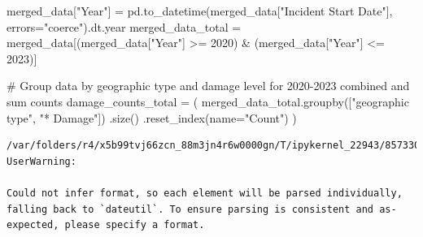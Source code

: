 \documentclass[
  letterpaper,
  DIV=11,
  numbers=noendperiod]{scrartcl}
\newenvironment{Shaded}{\begin{snugshade}}{\end{snugshade}}
\newcommand{\CommentTok}[1]{\textcolor[rgb]{0.37,0.37,0.37}{#1}}
\newcommand{\DecValTok}[1]{\textcolor[rgb]{0.68,0.00,0.00}{#1}}
\newcommand{\NormalTok}[1]{\textcolor[rgb]{0.00,0.23,0.31}{#1}}
\newcommand{\OperatorTok}[1]{\textcolor[rgb]{0.37,0.37,0.37}{#1}}
\newcommand{\StringTok}[1]{\textcolor[rgb]{0.13,0.47,0.30}{#1}}
\begin{document}
\begin{Shaded}
\begin{Highlighting}[]
\NormalTok{merged\_data[}\StringTok{"Year"}\NormalTok{] }\OperatorTok{=}\NormalTok{ pd.to\_datetime(merged\_data[}\StringTok{"Incident Start Date"}\NormalTok{], errors}\OperatorTok{=}\StringTok{"coerce"}\NormalTok{).dt.year}
\NormalTok{merged\_data\_total }\OperatorTok{=}\NormalTok{ merged\_data[(merged\_data[}\StringTok{"Year"}\NormalTok{] }\OperatorTok{\textgreater{}=} \DecValTok{2020}\NormalTok{) }\OperatorTok{\&}\NormalTok{ (merged\_data[}\StringTok{"Year"}\NormalTok{] }\OperatorTok{\textless{}=} \DecValTok{2023}\NormalTok{)]}

\CommentTok{\# Group data by geographic type and damage level for 2020{-}2023 combined and sum counts}
\NormalTok{damage\_counts\_total }\OperatorTok{=}\NormalTok{ (}
\NormalTok{    merged\_data\_total.groupby([}\StringTok{"geographic type"}\NormalTok{, }\StringTok{"* Damage"}\NormalTok{])}
\NormalTok{    .size()}
\NormalTok{    .reset\_index(name}\OperatorTok{=}\StringTok{"Count"}\NormalTok{)}
\NormalTok{)}
\end{Highlighting}
\end{Shaded}

\begin{verbatim}
/var/folders/r4/x5b99tvj66zcn_88m3jn4r6w0000gn/T/ipykernel_22943/857330891.py:1: UserWarning:

Could not infer format, so each element will be parsed individually, falling back to `dateutil`. To ensure parsing is consistent and as-expected, please specify a format.
\end{verbatim}
\end{document}
